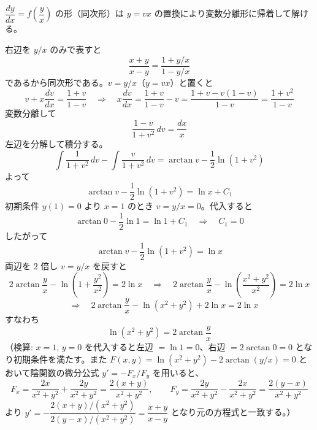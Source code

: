 
$\dfrac{dy}{dx} = f\!\left(\dfrac{y}{x}\right)$ の形（同次形）は $y = vx$ の置換により変数分離形に帰着して解ける。

右辺を $y/x$ のみで表すと
\[
\frac{x+y}{x-y} = \frac{1 + y/x}{1 - y/x}
\]
であるから同次形である。$v = y/x$（$y = vx$）と置くと
\[
v + x\frac{dv}{dx} = \frac{1+v}{1-v}
\quad\Longrightarrow\quad
x\frac{dv}{dx} = \frac{1+v}{1-v} - v = \frac{1+v - v(1-v)}{1-v} = \frac{1+v^{2}}{1-v}
\]
変数分離して
\[
\frac{1-v}{1+v^{2}}\,dv = \frac{dx}{x}
\]
左辺を分解して積分する。
\[
\int\frac{1}{1+v^{2}}\,dv - \int\frac{v}{1+v^{2}}\,dv
= \arctan v - \frac12\ln\!\left(1+v^{2}\right)
\]
よって
\[
\arctan v - \frac12\ln\!\left(1+v^{2}\right) = \ln x + C_{1}
\]
初期条件 $y(1)=0$ より $x=1$ のとき $v = y/x = 0$。代入すると
\[
\arctan 0 - \frac12\ln 1 = \ln 1 + C_{1}
\quad\Longrightarrow\quad
C_{1} = 0
\]
したがって
\[
\arctan v - \frac12\ln\!\left(1+v^{2}\right) = \ln x
\]
両辺を $2$ 倍し $v = y/x$ を戻すと
\[
2\arctan\frac{y}{x} - \ln\!\left(1 + \frac{y^{2}}{x^{2}}\right) = 2\ln x
\quad\Longrightarrow\quad
2\arctan\frac{y}{x} - \ln\!\left(\frac{x^{2}+y^{2}}{x^{2}}\right) = 2\ln x
\]
\[
\quad\Longrightarrow\quad
2\arctan\frac{y}{x} - \ln\!\left(x^{2}+y^{2}\right) + 2\ln x = 2\ln x
\]
すなわち
\[
\boxed{\; \ln\!\left(x^{2}+y^{2}\right) = 2\arctan\frac{y}{x} \;}
\]
（検算: $x=1,\,y=0$ を代入すると左辺 $=\ln 1 = 0$、右辺 $=2\arctan 0 = 0$ となり初期条件を満たす。また $F(x,y) = \ln(x^{2}+y^{2}) - 2\arctan(y/x) = 0$ とおいて陰関数の微分公式 $y' = -F_{x}/F_{y}$ を用いると、
\[
F_{x} = \frac{2x}{x^{2}+y^{2}} + \frac{2y}{x^{2}+y^{2}} = \frac{2(x+y)}{x^{2}+y^{2}},
\qquad
F_{y} = \frac{2y}{x^{2}+y^{2}} - \frac{2x}{x^{2}+y^{2}} = \frac{2(y-x)}{x^{2}+y^{2}}
\]
より $y' = -\dfrac{2(x+y)/(x^{2}+y^{2})}{2(y-x)/(x^{2}+y^{2})} = \dfrac{x+y}{x-y}$ となり元の方程式と一致する。）
